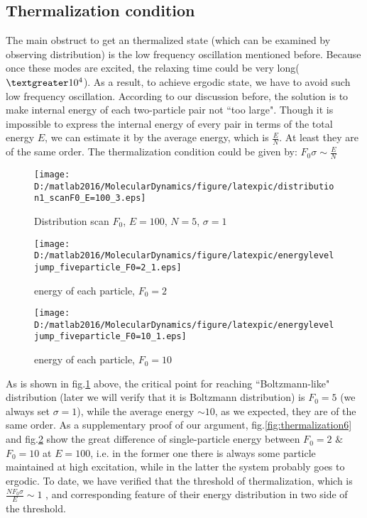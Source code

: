 \documentclass[aps,pre,twocolumn
,groupedaddress]{revtex4-1}
\begin{document}
\subsection{Thermalization condition}
The main obstruct to get an thermalized state (which can be examined by observing distribution) is the low frequency oscillation mentioned before. Because once these modes are excited, the relaxing time could be very long($\textgreater 10^4$). As a result, to achieve ergodic state, we have to avoid such low frequency oscillation. According to our discussion before, the solution is to make internal energy of each two-particle pair not ``too large". Though it is impossible to express the internal energy of every pair in terms of the total energy $E$, we can estimate it by the average energy, which is $\frac{E}{N}$. At least they are of the same order. The thermalization condition could be given by:
$F_0\sigma\sim\frac{E}{N}$


\begin{figure}[hbtp]
\centering
\texttt{[image: D:/matlab2016/MolecularDynamics/figure/latexpic/distribution1\_scanF0\_E=100\_3.eps]}
\caption{Distribution scan $F_0$, $E=100$, $N=5$, $\sigma=1$ {\color{red}{Run again!}} }
\label{fig:thermalization5}

\end{figure}




\begin{figure}
\centering
\texttt{[image: D:/matlab2016/MolecularDynamics/figure/latexpic/energyleveljump\_fiveparticle\_F0=2\_1.eps]}
\caption{energy of each particle, $F_0=2$}
\label{fig:thermalization6}

\centering
\texttt{[image: D:/matlab2016/MolecularDynamics/figure/latexpic/energyleveljump\_fiveparticle\_F0=10\_1.eps]}
\caption{energy of each particle, $F_0=10$}
\label{fig:thermalization7}
\end{figure}

As is shown in fig.\ref{fig:thermalization5} above, the critical point for reaching ``Boltzmann-like" distribution (later we will verify that it is Boltzmann distribution) is $F_0=5$ (we always set $\sigma=1$), while the average energy $\sim 10$, as we expected, they are of the same order. As a supplementary proof of our argument, fig.\ref{fig:thermalization6} and fig.\ref{fig:thermalization7} show the great difference of single-particle energy between $F_0=2$ $\&$ $F_0=10$ at $E=100$, i.e. in the former one there is always some particle maintained at high excitation, while in the latter the system probably goes to ergodic. To date, we have verified that the threshold of thermalization, which is $\frac{NF_0\sigma}{E}\sim1 $ , and corresponding feature of their energy distribution in two side of the threshold.
\end{document}
